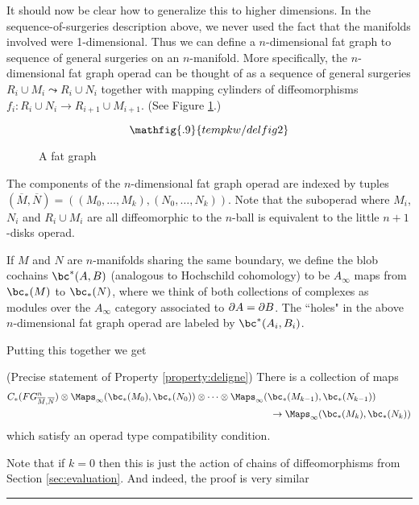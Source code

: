 It should now be clear how to generalize this to higher dimensions.
In the sequence-of-surgeries description above, we never used the fact that the manifolds
involved were 1-dimensional.
Thus we can define a $n$-dimensional fat graph to sequence of general surgeries
on an $n$-manifold.
More specifically,
the $n$-dimensional fat graph operad can be thought of as a sequence of general surgeries
$R_i \cup M_i \leadsto R_i \cup N_i$ together with mapping cylinders of diffeomorphisms
$f_i: R_i\cup N_i \to R_{i+1}\cup M_{i+1}$.
(See Figure \ref{delfig2}.)
\begin{figure}[!ht]
$$\mathfig{.9}{tempkw/delfig2}$$
\caption{A fat graph}\label{delfig2}\end{figure}
The components of the $n$-dimensional fat graph operad are indexed by tuples
$(\overline{M}, \overline{N}) = ((M_0,\ldots,M_k), (N_0,\ldots,N_k))$.
Note that the suboperad where $M_i$, $N_i$ and $R_i\cup M_i$ are all diffeomorphic to 
the $n$-ball is equivalent to the little $n{+}1$-disks operad.


If $M$ and $N$ are $n$-manifolds sharing the same boundary, we define
the blob cochains $\bc^*(A, B)$ (analogous to Hochschild cohomology) to be
$A_\infty$ maps from $\bc_*(M)$ to $\bc_*(N)$, where we think of both
collections of complexes as modules over the $A_\infty$ category associated to $\partial A = \partial B$.
The ``holes" in the above 
$n$-dimensional fat graph operad are labeled by $\bc^*(A_i, B_i)$.

Putting this together we get 
\begin{prop}(Precise statement of Property \ref{property:deligne})
\label{prop:deligne}
There is a collection of maps
\begin{eqnarray*}
	C_*(FG^n_{\overline{M}, \overline{N}})\otimes \mapinf(\bc_*(M_0), \bc_*(N_0))\otimes\cdots\otimes 
\mapinf(\bc_*(M_{k-1}), \bc_*(N_{k-1})) & \\
	& \hspace{-11em}\to  \mapinf(\bc_*(M_k), \bc_*(N_k))
\end{eqnarray*}
which satisfy an operad type compatibility condition. 
\end{prop}

Note that if $k=0$ then this is just the action of chains of diffeomorphisms from Section \ref{sec:evaluation}.
And indeed, the proof is very similar 



\medskip
\hrule\medskip

